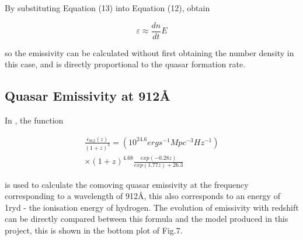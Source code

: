 \documentclass[12pt, twocolumn]{report}%
\begin{document}
\noindent By substituting Equation (13) into Equation (12), obtain

\begin{equation}
    \varepsilon\approx\frac{dn}{dt}E
\end{equation}

\noindent so the emissivity can be calculated without first obtaining the number density in this case, and is directly proportional to the quasar formation rate.

\subsection{Quasar Emissivity at 912\AA}

In \cite{Haardt_Madau}, the function

\begin{multline}
    \frac{\epsilon_{912}(z)}{(1+z)^3}=(10^{24.6}erg s^{-1}Mpc^{-3}Hz^{-1})\\
    \times(1+z)^{4.68}\frac{exp(-0.28z)}{exp(1.77z)+26.3}
\end{multline}

\noindent is used to calculate the comoving quasar emissivity at the frequency corresponding to a wavelength of 912\AA, this also corresponds to an energy of 1ryd - the ionisation energy of hydrogen. The evolution of emissivity with redshift can be directly compared between this formula and the model produced in this project, this is shown in the bottom plot of Fig.7.

\onecolumngrid
\end{document}
